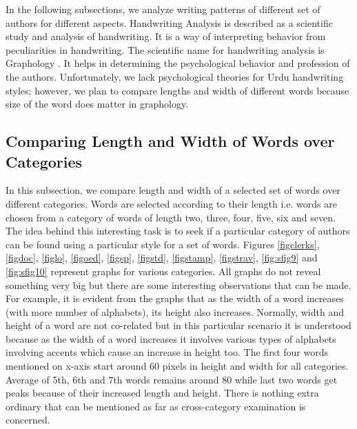 \documentclass[a4paper,conference]{IEEEtran}
\begin{document}
In the following subsections, we analyze writing patterns of different set of authors for different aspects. Handwriting Analysis is described as a scientific study and analysis of handwriting. It is a way of interpreting behavior from peculiarities in handwriting. The scientific name for handwriting analysis is Graphology \cite{graphology}. It helps in determining the psychological behavior and profession of the authors. Unfortunately, we lack psychological theories for Urdu handwriting styles; however, we plan to compare lengths and width of different words because size of the word does matter in graphology. 


\subsection{Comparing Length and Width of Words over Categories}

In this subsection, we compare length and width of a selected set of words over different categories. Words are selected according to their length i.e. words are chosen from a category of words of length two, three, four, five, six and seven. The idea behind this interesting task is to seek if a particular category of authors can be found using a particular style for a set of words. Figures \ref{figclerks}, \ref{figdoc}, \ref{figlo}, \ref{figoed}, \ref{figsp}, \ref{figstd}, \ref{figstamp}, \ref{figstrav}, \ref{fig:sfig9} and \ref{fig:sfig10} represent graphs for various categories. All graphs do not reveal something very big but there are some interesting observations that can be made. For example, it is evident from the graphs that as the width of a word increases (with more number of alphabets), its height also increases. Normally, width and height of a word are not co-related but in this particular scenario it is understood because as the width of a word increases it involves various types of alphabets involving accents which cause an increase in height too. The first four words mentioned on x-axis start around 60 pixels in height and width for all categories. Average of 5th, 6th and 7th words remains around 80 while last two words get peaks because of their increased length and height. There is nothing extra ordinary that can be mentioned as far as cross-category examination is concerned. 









     
\end{document}
